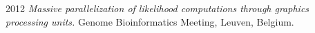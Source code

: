 \documentclass[a4paper, oneside, final]{scrartcl}
\newenvironment{lyxlist}[1]
{\begin{list}{}
{\settowidth{\labelwidth}{#1}
 \setlength{\leftmargin}{\labelwidth}
 \addtolength{\leftmargin}{\labelsep}
 \renewcommand{\makelabel}[1]{##1\hfil}}}
{\end{list}}
\newcommand{\noun}[1]{\textsc{#1}}
\begin{document}
\begin{center}
\begin{lyxlist}{00.00.0000}
\item [{\noun{\scriptsize 2012}}] \emph{Massive parallelization of likelihood computations through graphics processing units.}
Genome Bioinformatics Meeting, Leuven, Belgium.




\end{lyxlist}




%
%



\end{center}
\end{document}

